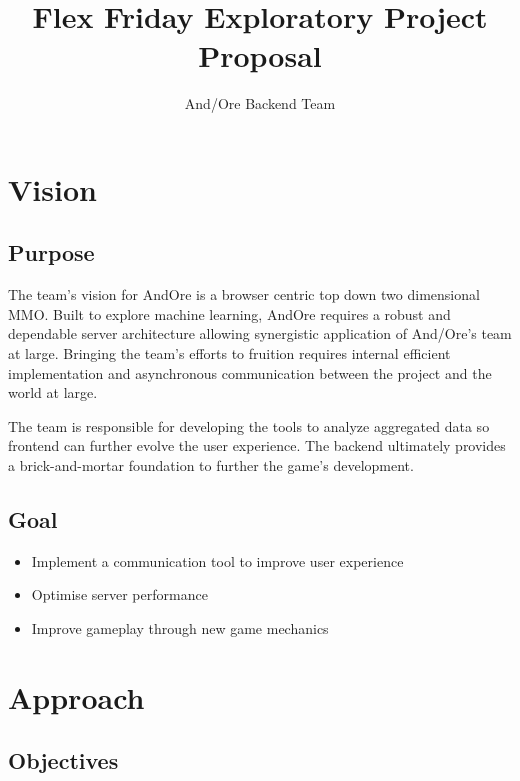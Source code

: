 \documentclass[11pt]{article}
\title{\textbf{{\color{blue}Flex Friday Exploratory Project Proposal}}}
\author{And/Ore Backend Team}
\date{}
\begin{document}
\maketitle

\section{{\color{blue}Vision}}

\subsection{{\color{blue}Purpose}}

The team's vision for AndOre is a browser centric top down two dimensional MMO. Built to explore machine learning, AndOre requires a robust and dependable server architecture allowing synergistic application of And/Ore’s team at large. Bringing the team's efforts to fruition requires internal efficient implementation and asynchronous communication between the project and the world at large.
 
The team is responsible for developing the tools to analyze aggregated data so frontend can further evolve the user experience. The backend ultimately provides a brick-and-mortar foundation to further the game's development.

\subsection{{\color{blue}Goal}}

\begin{itemize}
\item Implement a communication tool to improve user experience
\item Optimise server performance
\item Improve gameplay through new game mechanics
\end{itemize}

\section{{\color{blue}Approach}}


\subsection{{\color{blue}Objectives}}
\end{document}
